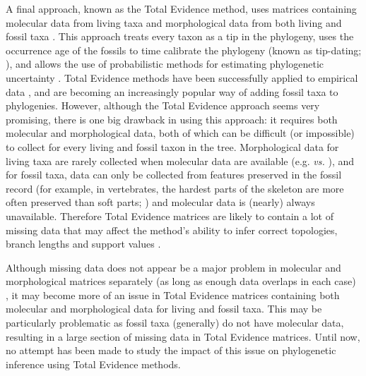 \documentclass[12pt,letterpaper]{article}
\begin{document}
A final approach, known as the Total Evidence method, uses matrices containing molecular data from living taxa and morphological data from both living and fossil taxa \citep{eernissetaxonomic1993}. This approach treats every taxon as a tip in the phylogeny, uses the occurrence age of the fossils to time calibrate the phylogeny (known as tip-dating; \citealt{ronquista2012}), and allows the use of probabilistic methods for estimating phylogenetic uncertainty \citep{ronquista2012}. Total Evidence methods have been successfully applied to empirical data \citep[e.g.][]{pyrondivergence2011,ronquista2012,schragocombining2013,slaterphylogenetic2013,beckancient2014}, and are becoming an increasingly popular way of adding fossil taxa to phylogenies.
However, although the Total Evidence approach seems very promising, there is one big drawback in using this approach: it requires both molecular and morphological data, both of which can be difficult (or impossible) to collect for every living and fossil taxon in the tree.
Morphological data for living taxa are rarely collected when molecular data are available (e.g. \citealt{O'Leary08022013} \textit{vs.} \citealt{meredithimpacts2011}), and for fossil taxa, data can only be collected from features preserved in the fossil record (for example, in vertebrates, the hardest parts of the skeleton are more often preserved than soft parts; \citealt{sansomfossilization2013}) and molecular data is (nearly) always unavailable. Therefore Total Evidence matrices are likely to contain a lot of missing data that may affect the method's ability to infer correct topologies, branch lengths and support values \citep{salamin2003}. 

Although missing data does not appear be a major problem in molecular and morphological matrices separately (as long as enough data overlaps in each case)
 \citep{wiensmissing2003,wiensmissing2006,wiensmissing2008,rouresite-specific2011,pattinsonphylogeny2014}, it may become more of an issue in Total Evidence matrices containing both molecular and morphological data for living and fossil taxa. This may be particularly problematic as fossil taxa (generally) do not have molecular data, resulting in a large section of missing data in Total Evidence matrices. Until now, no attempt has been made to study the impact of this issue on phylogenetic inference using Total Evidence methods.
\end{document}
